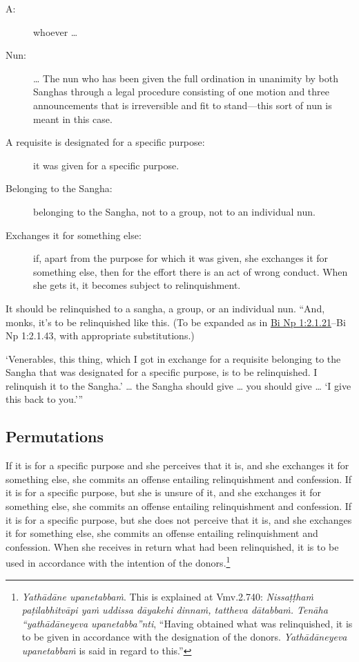 \documentclass[12pt,openany]{book}%
\begin{document}
\begin{description}%
\item[A: ] whoever … %
\item[Nun: ] … The nun who has been given the full ordination in unanimity by both Sanghas through a legal procedure consisting of one motion and three announcements that is irreversible and fit to stand—this sort of nun is meant in this case. %
\item[A requisite is designated for a specific purpose: ] it was given for a specific purpose. %
\item[Belonging to the Sangha: ] belonging to the Sangha, not to a group, not to an individual nun. %
\item[Exchanges it for something else: ] if, apart from the purpose for which it was given, she exchanges it for something else, then for the effort there is an act of wrong conduct. When she gets it, it becomes subject to relinquishment. %
\end{description}

It should be relinquished to a sangha, a group, or an individual nun. “And, monks, it’s to be relinquished like this. (To be expanded as in \href{https://suttacentral.net/pli-tv-bi-vb-np1/en/brahmali\#2.1.21}{Bi Np 1:2.1.21}–Bi Np 1:2.1.43, with appropriate substitutions.) 

‘Venerables, this thing, which I got in exchange for a requisite belonging to the Sangha that was designated for a specific purpose, is to be relinquished. I relinquish it to the Sangha.’ … the Sangha should give … you should give … ‘I give this back to you.’” 

\subsection*{Permutations }

If it is for a specific purpose and she perceives that it is, and she exchanges it for something else, she commits an offense entailing relinquishment and confession. If it is for a specific purpose, but she is unsure of it, and she exchanges it for something else, she commits an offense entailing relinquishment and confession. If it is for a specific purpose, but she does not perceive that it is, and she exchanges it for something else, she commits an offense entailing relinquishment and confession. When she receives in return what had been relinquished, it is to be used in accordance with the intention of the donors.\footnote{\textit{\textsanskrit{Yathādāne} \textsanskrit{upanetabbaṁ}}. This is explained at Vmv.2.740: \textit{\textsanskrit{Nissaṭṭhaṁ} \textsanskrit{paṭilabhitvāpi} \textsanskrit{yaṁ} uddissa \textsanskrit{dāyakehi} \textsanskrit{dinnaṁ}, tattheva \textsanskrit{dātabbaṁ}. \textsanskrit{Tenāha} “\textsanskrit{yathādāneyeva} upanetabba”nti}, “Having obtained what was relinquished, it is to be given in accordance with the designation of the donors. \textit{\textsanskrit{Yathādāneyeva} \textsanskrit{upanetabbaṁ}} is said in regard to this.” } 
\end{document}
